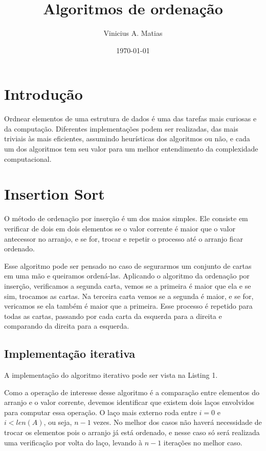 \documentclass[a4paper, twocolumn]{article}
\title{Algoritmos de ordenação}
\author{Vinicius A. Matias}
\date{\today}
\theoremstyle{definition}
\begin{document}
	\maketitle
	
	\section{Introdução}
	Ordnear elementos de uma estrutura de dados é uma das tarefas mais curiosas e da computação. Diferentes implementações podem ser realizadas, das mais triviais às mais eficientes, assumindo heurísticas dos algoritmos ou não, e cada um dos algoritmos tem seu valor para um melhor entendimento da complexidade computacional.
	
	\section{Insertion Sort}
	O método de ordenação por inserção é um dos maios simples. Ele consiste em verificar de dois em dois elementos se o valor corrente é maior que o valor antecessor no arranjo, e se for, trocar e repetir o processo até o arranjo ficar ordenado.
	
	Esse algoritmo pode ser pensado no caso de segurarmos um conjunto de cartas em uma mão e queiramos ordená-las. Aplicando o algoritmo da ordenação por inserção, verificamos a segunda carta, vemos se a primeira é maior que ela e se sim, trocamos as cartas. Na terceira carta vemos se a segunda é maior, e se for, vericamos se ela também é maior que a primeira. Esse processo é repetido para todas as cartas, passando por cada carta da esquerda para a direita e comparando da direita para a esquerda.
	
	\subsection{Implementação iterativa}	
	
	A implementação do algoritmo iterativo pode ser vista na Listing 1.
		
	Como a operação de interesse desse algoritmo é a comparação entre elementos do arranjo e o valor corrente, devemos identificar que existem dois laços envolvidos para computar essa operação. O laço mais externo roda entre $i=0$ e $i<len(A)$, ou seja, $n-1$ vezes. No melhor dos casos não haverá necessidade de trocar os elementos pois o arranjo já está ordenado, e nesse caso só será realizada uma verificação por volta do laço, levando à $n-1$ iterações no melhor caso. 
\end{document}
